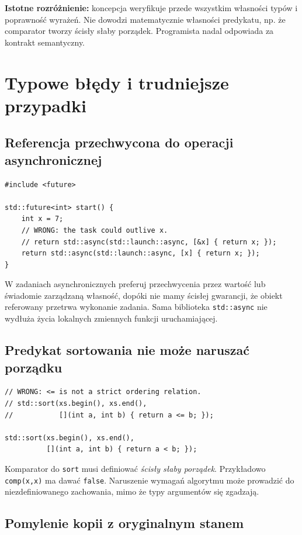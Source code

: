 \textbf{Istotne rozróżnienie:} koncepcja weryfikuje przede wszystkim
własności typów i poprawność wyrażeń. Nie dowodzi matematycznie
własności predykatu, np. że comparator tworzy ścisły słaby porządek.
Programista nadal odpowiada za kontrakt semantyczny.

\section{Typowe błędy i trudniejsze przypadki}
\label{sec:lambda-pitfalls}

\subsection{Referencja przechwycona do operacji asynchronicznej}

\begin{lstlisting}
#include <future>

std::future<int> start() {
    int x = 7;
    // WRONG: the task could outlive x.
    // return std::async(std::launch::async, [&x] { return x; });
    return std::async(std::launch::async, [x] { return x; });
}
\end{lstlisting}

W zadaniach asynchronicznych preferuj przechwycenia przez wartość
lub świadomie zarządzaną własność, dopóki nie mamy ścisłej gwarancji,
że obiekt referowany przetrwa wykonanie zadania. Sama biblioteka
\texttt{std::async} nie wydłuża życia lokalnych zmiennych funkcji
uruchamiającej.

\subsection{Predykat sortowania nie może naruszać porządku}

\begin{lstlisting}
// WRONG: <= is not a strict ordering relation.
// std::sort(xs.begin(), xs.end(),
//           [](int a, int b) { return a <= b; });

std::sort(xs.begin(), xs.end(),
          [](int a, int b) { return a < b; });
\end{lstlisting}

Komparator do \texttt{sort} musi definiować \emph{ścisły słaby
porządek}. Przykładowo \texttt{comp(x,x)} ma dawać \texttt{false}.
Naruszenie wymagań algorytmu może prowadzić do niezdefiniowanego
zachowania, mimo że typy argumentów się zgadzają.

\subsection{Pomylenie kopii z oryginalnym stanem}

